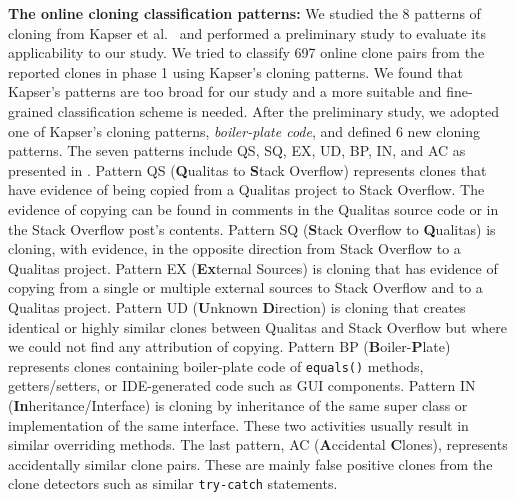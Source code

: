 \documentclass[sigconf,review, anonymous]{acmart}
\begin{document}
\textbf{The online cloning classification patterns:} 
We studied the 8 patterns of cloning from Kapser et
al.~\cite{Kapser2006,Kapser2008} and performed a preliminary study to
evaluate its applicability to our study. 
We tried to classify 697 online clone pairs from
the reported clones in phase 1 
using Kapser's cloning patterns. We found that 
Kapser's patterns are too broad for our study and a
more suitable and fine-grained classification scheme is needed. After
the preliminary study, we adopted one of Kapser's cloning patterns,
\emph{boiler-plate code}, and defined
6 new cloning patterns. The seven patterns include QS, SQ, EX, UD, BP,
IN, and AC as presented in . Pattern
QS (\textbf{Q}ualitas to \textbf{S}tack Overflow) represents clones
that have evidence of being copied from a Qualitas project to Stack
Overflow. The evidence of copying can be found in comments in the
Qualitas source code or in the Stack Overflow post's contents. Pattern
SQ (\textbf{S}tack Overflow to \textbf{Q}ualitas) is cloning, with
evidence, in the opposite direction from Stack Overflow to a Qualitas
project. Pattern EX (\textbf{Ex}ternal Sources) is cloning that has
evidence of copying from a single or multiple external sources to
Stack Overflow and to a Qualitas project.  Pattern UD
(\textbf{U}nknown \textbf{D}irection) is cloning that creates
identical or highly similar clones between Qualitas and Stack Overflow
but where we could not find any attribution of copying.
Pattern BP (\textbf{B}oiler-\textbf{P}late) represents clones
containing boiler-plate code of {\small\verb|equals()|} methods,
getters/setters, or IDE-generated code such as GUI components. Pattern
IN (\textbf{In}heritance/Interface) is cloning by inheritance of the
same super class or implementation of the same interface. These two
activities usually result in similar overriding methods. The last
pattern, AC (\textbf{A}ccidental \textbf{C}lones), represents
accidentally similar clone pairs. These are mainly false positive
clones from the clone detectors such as similar
{\small\texttt{try-catch}} statements.
\end{document}
